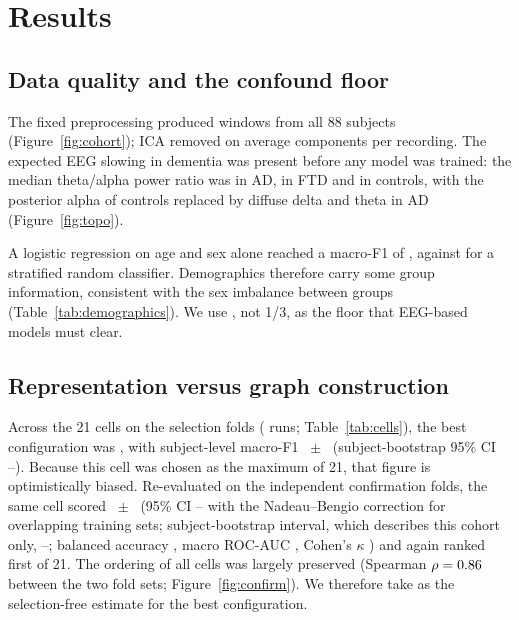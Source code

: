 \section{Results}\label{sec:results}

\subsection{Data quality and the confound floor}\label{sec:res-qc}
The fixed preprocessing produced \nWindows{} windows from all 88 subjects (Figure~\ref{fig:cohort});
ICA removed on average \icaExcludedMean{} components per recording. The expected EEG slowing in
dementia was present before any model was trained: the median theta/alpha power ratio was
\thetaAlphaAD{} in AD, \thetaAlphaFTD{} in FTD and \thetaAlphaCN{} in controls, with the posterior alpha
of controls replaced by diffuse delta and theta in AD (Figure~\ref{fig:topo}).

A logistic regression on age and sex alone reached a macro-F1 of \demoFOne{}, against \chanceFOne{}
for a stratified random classifier. Demographics therefore carry some group information, consistent
with the sex imbalance between groups (Table~\ref{tab:demographics}). We use \demoFOne{}, not 1/3, as
the floor that EEG-based models must clear.

\subsection{Representation versus graph construction}\label{sec:res-grid}
Across the 21 cells on the selection folds (\nMainRuns{} runs; Table~\ref{tab:cells}), the best
configuration was \bestCell{}, with subject-level macro-F1 \bestFOne{}~$\pm$~\bestFOneSd{}
(subject-bootstrap 95\% CI \bestFOneCiLo{}--\bestFOneCiHi{}). Because this cell was chosen as the
maximum of 21, that figure is optimistically biased. Re-evaluated on the independent confirmation
folds, the same cell scored \confFOne{}~$\pm$~\confFOneSd{} (95\% CI \confFOneNbLo{}--\confFOneNbHi{} with the Nadeau--Bengio correction for overlapping training sets; subject-bootstrap interval, which describes this cohort only, \confFOneCiLo{}--\confFOneCiHi{};
balanced accuracy \confBalAcc{}, macro ROC-AUC \confAuc{}, Cohen's $\kappa$ \confKappa{}) and again
ranked first of 21. The ordering of all cells was largely preserved (Spearman $\rho=0.86$
between the two fold sets; Figure~\ref{fig:confirm}). We therefore take \confFOne{} as the
selection-free estimate for the best configuration.

